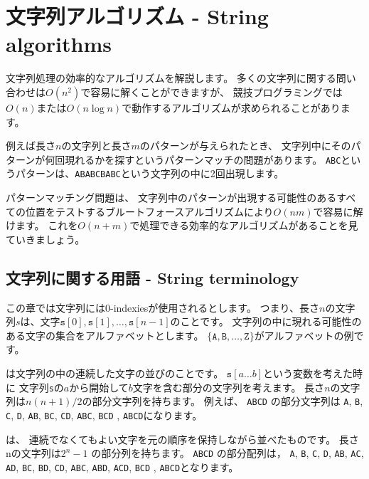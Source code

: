 \chapter{文字列アルゴリズム - String algorithms}

文字列処理の効率的なアルゴリズムを解説します。
多くの文字列に関する問い合わせは$O(n^2)$で容易に解くことができますが、
競技プログラミングでは$O(n)$または$O(n \log n)$で動作するアルゴリズムが求められることがあります。

例えば長さ$n$の文字列と長さ$m$のパターンが与えられたとき、
文字列中にそのパターンが何回現れるかを探すというパターンマッチの問題があります。
\texttt{ABC}というパターンは、\texttt{ABABCBABC}という文字列の中に2回出現します。

パターンマッチング問題は、
文字列中のパターンが出現する可能性のあるすべての位置をテストするブルートフォースアルゴリズムにより$O(nm)$で容易に解けます。
これを$O(n + m)$で処理できる効率的なアルゴリズムがあることを見ていきましょう。


\section{文字列に関する用語 - String terminology}


この章では文字列には0-indexiesが使用されるとします。
つまり、長さ$n$の文字列$s$は、文字$\texttt{s}[0],\texttt{s}[1],\ldots,\texttt{s}[n-1]$のことです。
文字列の中に現れる可能性のある文字の集合をアルファベットとします。
$\{\texttt{A},\texttt{B},\ldots,\texttt{Z}\}$がアルファベットの例です。


は文字列の中の連続した文字の並びのことです。
$\texttt{s}[a \ldots b]$という変数を考えた時に
文字列\texttt{s}の$a$から開始して$b$文字を含む部分の文字列を考えます。
長さ$n$の文字列は$n(n+1)/2$の部分文字列を持ちます。
例えば、
\texttt{ABCD} の部分文字列は
\texttt{A}, \texttt{B}, \texttt{C}, \texttt{D},
\texttt{AB}, \texttt{BC}, \texttt{CD},
\texttt{ABC}, \texttt{BCD} , \texttt{ABCD}になります。


は、
連続でなくてもよい文字を元の順序を保持しながら並べたものです。
長さnの文字列は$2^n-1$ の部分列を持ちます。
\texttt{ABCD}  の部分配列は，
\texttt{A}, \texttt{B}, \texttt{C}, \texttt{D},
\texttt{AB}, \texttt{AC}, \texttt{AD},
\texttt{BC}, \texttt{BD}, \texttt{CD},
\texttt{ABC}, \texttt{ABD}, \texttt{ACD},
\texttt{BCD} , \texttt{ABCD}となります。


